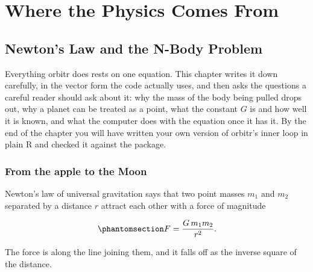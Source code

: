 \documentclass[
  10.5pt,
  letterpaper,
]{scrbook}
\theoremstyle{plain}
\theoremstyle{remark}
\begin{document}
\part{Where the Physics Comes From}

\chapter{Newton's Law and the N-Body Problem}\label{sec-newton}

Everything orbitr does rests on one equation. This chapter writes it
down carefully, in the vector form the code actually uses, and then asks
the questions a careful reader should ask about it: why the mass of the
body being pulled drops out, why a planet can be treated as a point,
what the constant \(G\) is and how well it is known, and what the
computer does with the equation once it has it. By the end of the
chapter you will have written your own version of orbitr's inner loop in
plain R and checked it against the package.

\section{From the apple to the Moon}\label{from-the-apple-to-the-moon}

Newton's law of universal gravitation says that two point masses \(m_1\)
and \(m_2\) separated by a distance \(r\) attract each other with a
force of magnitude

\begin{equation}\protect\phantomsection\label{eq-newton-scalar}{
F = \frac{G\,m_1 m_2}{r^2}.
}\end{equation}

The force is along the line joining them, and it falls off as the
inverse square of the distance.
\end{document}
